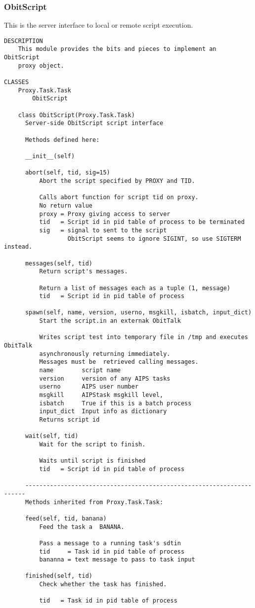 \documentclass[11pt]{report}
\begin{document}
\subsubsection{ObitScript}
This is the server interface to local or remote script execution.
\begin{verbatim}
DESCRIPTION
    This module provides the bits and pieces to implement an ObitScript
    proxy object.

CLASSES
    Proxy.Task.Task
        ObitScript
    
    class ObitScript(Proxy.Task.Task)
      Server-side ObitScript script interface
      
      Methods defined here:
      
      __init__(self)
      
      abort(self, tid, sig=15)
          Abort the script specified by PROXY and TID.
          
          Calls abort function for script tid on proxy.
          No return value
          proxy = Proxy giving access to server
          tid   = Script id in pid table of process to be terminated
          sig   = signal to sent to the script
                  ObitScript seems to ignore SIGINT, so use SIGTERM instead.
      
      messages(self, tid)
          Return script's messages.
          
          Return a list of messages each as a tuple (1, message)
          tid   = Script id in pid table of process
      
      spawn(self, name, version, userno, msgkill, isbatch, input_dict)
          Start the script.in an externak ObitTalk
          
          Writes script test into temporary file in /tmp and executes ObitTalk
          asynchronously returning immediately.
          Messages must be  retrieved calling messages.
          name        script name
          version     version of any AIPS tasks
          userno      AIPS user number
          msgkill     AIPStask msgkill level,
          isbatch     True if this is a batch process
          input_dict  Input info as dictionary
          Returns script id
      
      wait(self, tid)
          Wait for the script to finish.
          
          Waits until script is finished
          tid   = Script id in pid table of process
      
      ----------------------------------------------------------------------
      Methods inherited from Proxy.Task.Task:
      
      feed(self, tid, banana)
          Feed the task a  BANANA.
          
          Pass a message to a running task's sdtin
          tid     = Task id in pid table of process
          bananna = text message to pass to task input
      
      finished(self, tid)
          Check whether the task has finished.
          
          tid   = Task id in pid table of process
\end{verbatim}
\end{document}

